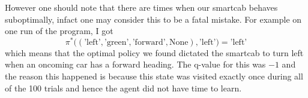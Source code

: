 \documentclass{article}
\begin{document}
However one should note that there are times when our smartcab behaves suboptimally, infact one may consider this to be a fatal mistake. For example on one run of the program, I got $$\pi^*\big((\text{'left'},\text{'green'}, \text{'forward'}, \text{None}), \text{'left'}\big)=\text{'left'}$$  
which means that the optimal policy we found dictated the smartcab to turn left when an oncoming car has a forward heading. The q-value for this was $-1$ and the reason this happened is because this state was visited exactly once during all of the 100 trials and hence the agent did not have time to learn.
\end{document}
